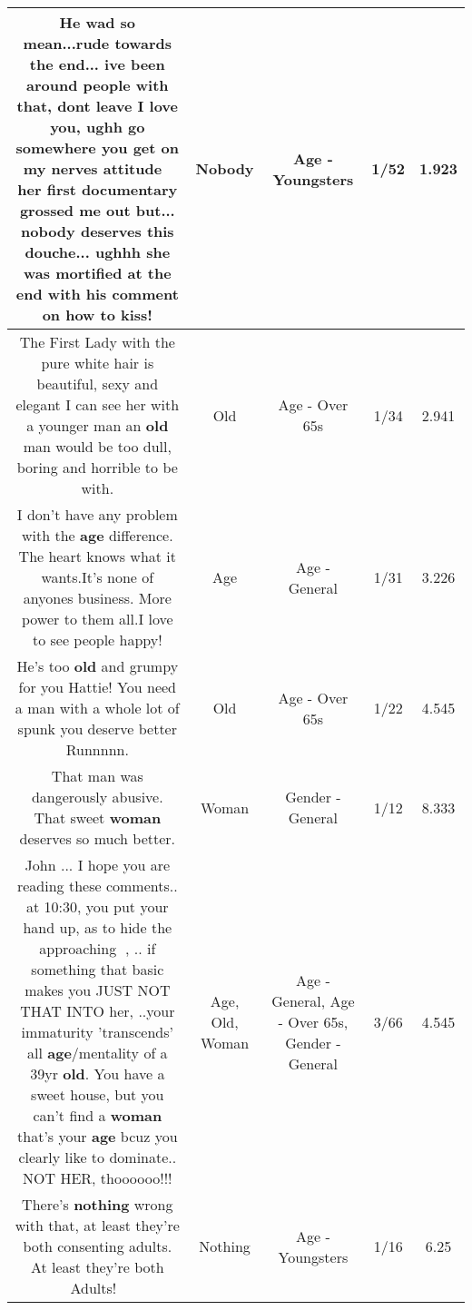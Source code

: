 \documentclass[11pt]{article}
\newlength\mylength
\begin{document}
\begin{center}
\begin{longtable}{|C{.65\mylength}|C{.30\mylength}|C{.12\mylength}|C{.12\mylength}|C{.12\mylength}|}
  \small He wad so mean...rude towards the end... ive been around people with that, dont leave I love you, ughh go somewhere you get on my nerves attitude 🤨her first documentary grossed me out but... \textbf{nobody} deserves this douche... ughhh she was mortified at the end with his comment on how to kiss!\normalsize   & Nobody & Age - Youngsters & 1/52 & 1.923 \\  \hline
  \small The First Lady with the pure white hair is beautiful, sexy and elegant I can see her with a younger man an \textbf{old} man would be too dull, boring and horrible to be with.\normalsize   & Old & Age - Over 65s & 1/34 & 2.941 \\  \hline
  \small I don't have any problem with the \textbf{age} difference. The heart knows what it wants.It's none of anyones business. More power to them all.I love to see people happy!\normalsize   & Age & Age - General & 1/31 & 3.226 \\  \hline
  \small He's too \textbf{old} and grumpy for you Hattie! You need a man with a whole lot of spunk you deserve better Runnnnn.\normalsize   & Old & Age - Over 65s & 1/22 & 4.545 \\  \hline
  \small That man was dangerously abusive. That sweet \textbf{woman} deserves so much better.\normalsize   & Woman & Gender - General & 1/12 & 8.333 \\  \hline
  \small John ... I hope you are reading these comments.. at 10:30, you put your hand up, as to hide the approaching 👄, .. if something that basic makes you JUST NOT THAT INTO her, ..your immaturity 'transcends' all \textbf{age}/mentality of a 39yr \textbf{old}. You have a sweet house, but you can't find a \textbf{woman} that's your \textbf{age} bcuz you clearly like to dominate.. NOT HER, thoooooo!!!\normalsize   & Age, Old, Woman & Age - General, Age - Over 65s, Gender - General & 3/66 & 4.545 \\  \hline
  \small There's \textbf{nothing} wrong with that, at least they're both consenting adults.  At least they're both Adults!👍🏿\normalsize   & Nothing & Age - Youngsters & 1/16 & 6.25 \\  \hline

\end{longtable}
\end{center}
\end{document}
